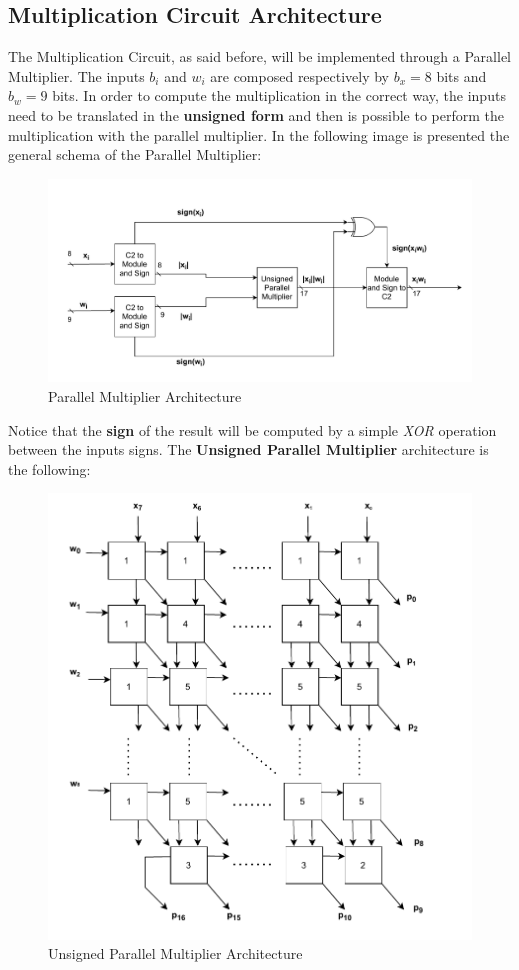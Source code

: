 \subsection{Multiplication Circuit Architecture}
The Multiplication Circuit, as said before, will be implemented through a Parallel Multiplier. The inputs $b_{i}$ and $w_{i}$ are composed respectively by $b_{x} = 8$ bits and $b_{w} = 9$ bits. In order to compute the multiplication in the correct way, the inputs need to be translated in the \textbf{unsigned form} and then is possible to perform the multiplication with the parallel multiplier.
In the following image is presented the general schema of the Parallel Multiplier:
\begin{figure}[H]
	\centering
	\includegraphics[width=\textwidth]{img/architecture_general_parallel_multiplier.pdf}
	\caption{Parallel Multiplier Architecture}
\end{figure}
Notice that the \textbf{sign} of the result will be computed by a simple \textit{XOR} operation between the inputs signs. 
The \textbf{Unsigned Parallel Multiplier} architecture is the following:
\begin{figure}[H]
	\centering
	\includegraphics[width=13cm]{img/architecture_parallel_multiplier.pdf}
	\caption{Unsigned Parallel Multiplier Architecture}
\end{figure}

